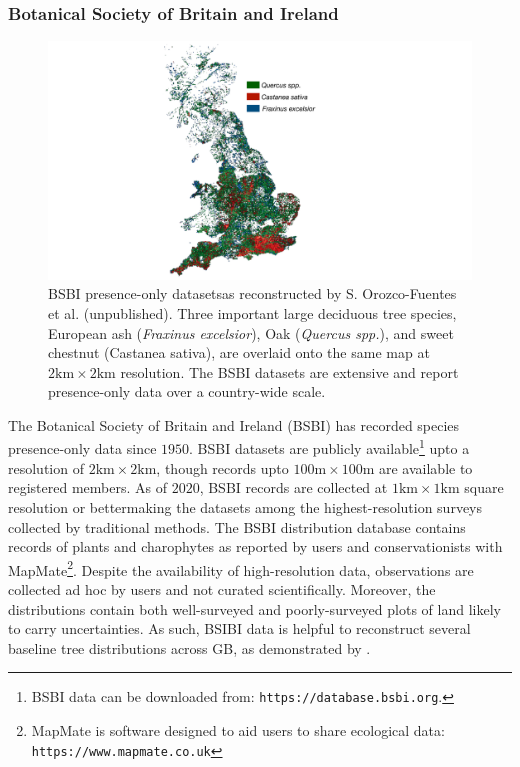 \subsubsection{Botanical Society of Britain and Ireland}

\begin{figure}
    \centering
    \includegraphics[scale=0.25]{chapter2/figures/bsbi-data.pdf}
    \caption{BSBI presence-only datasets\textemdash as reconstructed by S. Orozco-Fuentes et al. (unpublished).
    Three important large deciduous tree species, European ash (\textit{Fraxinus excelsior}), 
    Oak (\textit{Quercus spp.}), and sweet chestnut (Castanea sativa), are overlaid onto the same map at $\mathrm{2km \times 2km}$ resolution.
    The BSBI datasets are extensive and report presence-only data over a country-wide scale.
    }
    \label{fig:bsbi-data}
\end{figure}

The Botanical Society of Britain and Ireland (BSBI) has recorded species presence-only data since $1950$.
BSBI datasets are publicly available\footnote{BSBI data can be downloaded from: \nolinkurl{https://database.bsbi.org}.} upto a
resolution of $\mathrm{2 km \times 2km}$, though records upto $\mathrm{100 m \times 100 m}$ are available to registered members.
As of $2020$, BSBI records are collected at $\mathrm{1 km \times 1km}$ square resolution or better\textemdash making the datasets among the 
highest-resolution surveys collected by traditional methods. The BSBI distribution database contains records of plants and charophytes
as reported by users and conservationists with MapMate\footnote{MapMate is software designed to aid users to share ecological data: \nolinkurl{https://www.mapmate.co.uk}}.
Despite the availability of high-resolution data, observations are collected ad hoc by users and not curated scientifically.
Moreover, the distributions contain both well-surveyed and poorly-surveyed plots of land likely to carry uncertainties.
As such, BSIBI data is helpful to reconstruct several baseline tree distributions across GB, as demonstrated by \cite{hill.data}.

